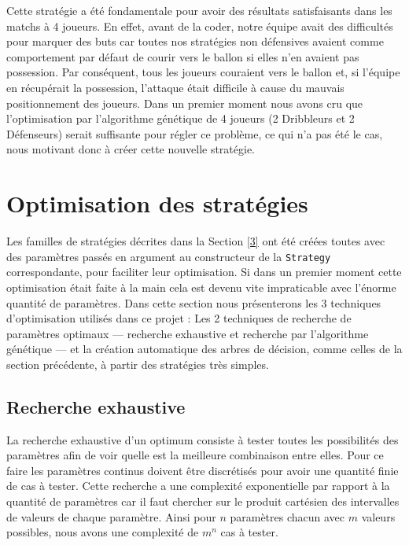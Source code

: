 \documentclass[a4paper,12pt]{article}
\begin{document}
Cette stratégie a été fondamentale pour avoir des résultats satisfaisants dans les matchs à 4 joueurs. En effet, avant de la coder, notre équipe avait des difficultés pour marquer des buts car toutes nos stratégies non défensives avaient comme comportement par défaut de courir vers le ballon si elles n'en avaient pas possession. Par conséquent, tous les joueurs couraient vers le ballon et, si l'équipe en récupérait la possession, l'attaque était difficile à cause du mauvais positionnement des joueurs. Dans un premier moment nous avons cru que l'optimisation par l'algorithme génétique de 4 joueurs (2 Dribbleurs et 2 Défenseurs) serait suffisante pour régler ce problème, ce qui n'a pas été le cas, nous motivant donc à créer cette nouvelle stratégie.

\section{Optimisation des stratégies}
\label{4}

Les familles de stratégies décrites dans la Section \ref{3} ont été créées toutes avec des paramètres passés en argument au constructeur de la \texttt{Strategy} correspondante, pour faciliter leur optimisation. Si dans un premier moment cette optimisation était faite à la main cela est devenu vite impraticable avec l'énorme quantité de paramètres. Dans cette section nous présenterons les 3 techniques d'optimisation utilisés dans ce projet : Les 2 techniques de recherche de paramètres optimaux --- recherche exhaustive et recherche par l'algorithme génétique --- et la création automatique des arbres de décision, comme celles de la section précédente, à partir des stratégies très simples.  

\subsection{Recherche exhaustive}

La recherche exhaustive d'un optimum consiste à tester toutes les possibilités des paramètres afin de voir quelle est la meilleure combinaison entre elles. Pour ce faire les paramètres continus doivent être discrétisés pour avoir une quantité finie de cas à tester. Cette recherche a une complexité exponentielle par rapport à la quantité de paramètres car il faut chercher sur le produit cartésien des intervalles de valeurs de chaque paramètre. Ainsi pour $n$ paramètres chacun avec $m$ valeurs possibles, nous avons une complexité de $m^n$ cas à tester. 
\end{document}
